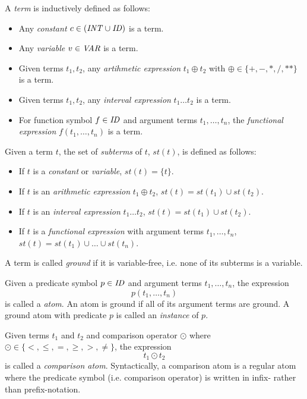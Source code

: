 \begin{definition}[Term]
\label{def:prelims-asp-syntax-term}
A \emph{term} is inductively defined as follows:
\begin{itemize}
	\item Any \emph{constant} $c \in (\mathit{INT} \cup \mathit{ID})$ is a term.
	\item Any \emph{variable} $v \in \mathit{VAR}$ is a term.
	\item Given terms $t_1, t_2$, any \emph{artihmetic expression} $t_1 \oplus t_2$ with $\oplus \in \{+, - , *, /, **\}$ is a term.
	\item Given terms $t_1, t_2$, any \emph{interval expression} $t_1 \ldots t_2$ is a term.
	\item For function symbol $f \in \mathit{ID}$ and argument terms $t_1, \ldots, t_n$, the \emph{functional expression} $f(t_1, \ldots, t_n)$ is a term.
\end{itemize}
\end{definition}

\begin{definition}[Subterms]
\label{def:prelims-asp-syntax-subterms}
Given a term $t$, the set of \emph{subterms} of $t$, $st(t)$, is defined as follows:
\begin{itemize}
	\item If $t$ is a \emph{constant} or \emph{variable}, $st(t) = \{t\}$.
	\item If $t$ is an \emph{arithmetic expression} $t_1 \oplus t_2$, $st(t) = st(t_1) \cup st(t_2)$.
	\item If $t$ is an \emph{interval expression} $t_1 \ldots t_2$, $st(t) = st(t_1) \cup st(t_2)$.
	\item If $t$ is a \emph{functional expression} with argument terms $t_1, \ldots, t_n$, $st(t) = st(t_1) \cup \ldots \cup st(t_n)$.
\end{itemize}
A term is called \emph{ground} if it is variable-free, i.e. none of its subterms is a variable.
\end{definition}

\begin{definition}
\label{def:prelims-asp-syntax-atom}
Given a predicate symbol $p \in \mathit{ID}$ and argument terms $t_1,\ldots,t_n$, the expression
\[
	p(t_1,\ldots,t_n)
\]
is called a \emph{atom}. An atom is ground if all of its argument terms are ground. A ground atom with predicate $p$ is called an \emph{instance} of $p$.
\end{definition}

\begin{definition}
\label{def:prelims-asp-syntax-cmp-atom}
Given terms $t_1$ and $t_2$ and comparison operator $\odot$ where $\odot \in \{ <, \leq, =, \geq, >, \neq \}$, the expression
\[
	t_1 \odot t_2
\]
is called a \emph{comparison atom}. Syntactically, a comparison atom is a regular atom where the predicate symbol (i.e. comparison operator) is written in infix- rather than prefix-notation.
\end{definition}

